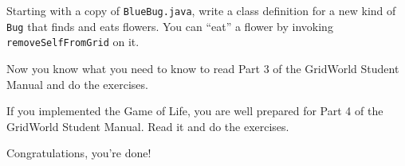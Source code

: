 \begin{exercise}
Starting with a copy of {\tt BlueBug.java}, write a class definition
for a new kind of {\tt Bug} that finds and eats flowers.  You can
``eat'' a flower by invoking {\tt removeSelfFromGrid} on it.
\end{exercise}

\begin{exercise}
Now you know what you need to know to read Part 3 of the
GridWorld Student Manual and do the exercises.
\end{exercise}

\begin{exercise}
If you implemented the Game of Life, you are well prepared for
Part 4 of the GridWorld Student Manual.  Read it and do the exercises.
\end{exercise}


Congratulations, you're done!


\appendix


